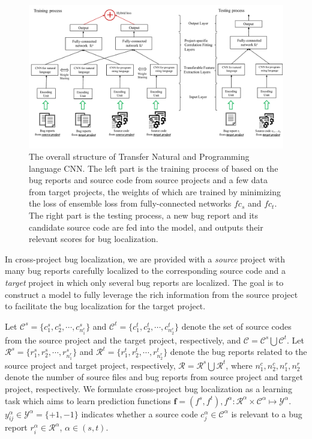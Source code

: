 \begin{figure}[hbt]
\centering
\includegraphics[width = 2\columnwidth]{pic/structure.pdf}
\caption{The overall structure of Transfer Natural and Programming language CNN.  The left part is the training process of \TRANPCNN based on the bug reports and source code from source projects and a few data from target projects, the weights of which are trained by minimizing the loss of ensemble loss from fully-connected networks $fc_s$ and $fc_t$. The right part is the testing process, a new bug report and its candidate source code are fed into the model, and \TRANPCNN outputs their relevant scores for bug localization.}
\label{fig:structure}
\end{figure}

In cross-project bug localization, we are provided with a \emph{source} project with many bug reports carefully localized to the corresponding source code and a \emph{target} project in which only several bug reports are localized. The goal is to construct a model to fully leverage the rich information from the source project to facilitate the bug localization for the target project. 

Let $\mathcal{C}^s =   \{ { c^s_1, c^s_2}, \cdots, c^s_{n^c_1} \} $ and $\mathcal{C}^t =\{ c^t_1, c^t_2, \cdots, c^t_{n^c_2} \}$ denote the set of source codes from the source project and the target project, respectively, and $\mathcal{C}=\mathcal{C}^s \bigcup \mathcal{C}^t $. Let $\mathcal{R}^s =\{ r^s_1, r^s_2, \cdots, r^s_{n^r_1}\}$ and $\mathcal{R}^t =\{ r^t_1, r^t_2, \cdots, r^t_{n^r_2}\}$ denote the bug reports related to the source project and target project, respectively, $\mathcal{R}=\mathcal{R}^s \bigcup \mathcal{R}^t $, where $n^c_1, n^c_2, n^r_1, n^r_2$ denote the number of source files and bug reports from source project and target project, respectively. We formulate cross-project bug localization as a learning task which aims to learn prediction functions $\mathbf{f}=(f^s,f^t), f^\alpha: \mathcal{R}^\alpha \times \mathcal{C}^\alpha \mapsto \mathcal{Y}^\alpha$. $y^\alpha_{ij} \in \mathcal{Y}^\alpha = \{+1, -1\}$ indicates whether a source code $c^\alpha_j \in \mathcal{C}^\alpha $ is relevant to a bug report $r^\alpha_i \in \mathcal{R}^\alpha$, $\alpha \in (s,t)$. 

